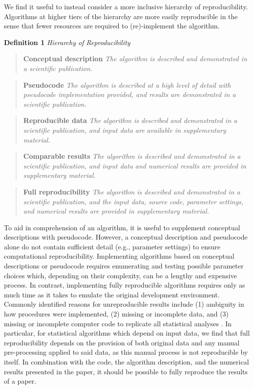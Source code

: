 \documentclass[11pt,]{isuthesis}
\begin{document}
We find it useful to instead consider a more inclusive hierarchy of reproducibility.
Algorithms at higher tiers of the hierarchy are more easily reproducible in the sense that fewer resources are required to (re)-implement the algorithm.

\textbf{Definition 1} \emph{Hierarchy of Reproducibility}

\begin{quote}
\textbf{Conceptual description} \emph{The algorithm is described and demonstrated in a scientific publication.}
\end{quote}

\begin{quote}
\textbf{Pseudocode} \emph{The algorithm is described at a high level of detail with pseudocode implementation provided, and results are demonstrated in a scientific publication.}
\end{quote}

\begin{quote}
\textbf{Reproducible data} \emph{The algorithm is described and demonstrated in a scientific publication, and input data are available in supplementary material.}
\end{quote}

\begin{quote}
\textbf{Comparable results} \emph{The algorithm is described and demonstrated in a scientific publication, and input data and numerical results are provided in supplementary material.}
\end{quote}

\begin{quote}
\textbf{Full reproducibility} \emph{The algorithm is described and demonstrated in a scientific publication, and the input data, source code, parameter settings, and numerical results are provided in supplementary material.}
\end{quote}

To aid in comprehension of an algorithm, it is useful to supplement conceptual descriptions with pseudocode.
However, a conceptual description and pseudocode alone do not contain sufficient detail (e.g., parameter settings) to ensure computational reproducibility.
Implementing algorithms based on conceptual descriptions or pseudocode requires enumerating and testing possible parameter choices which, depending on their complexity, can be a lengthy and expensive process.
In contrast, implementing fully reproducible algorithms requires only as much time as it takes to emulate the original development environment.
Commonly identified reasons for unreproducible results include (1) ambiguity in how procedures were implemented, (2) missing or incomplete data, and (3) missing or incomplete computer code to replicate all statistical analyses \citep{leek_is_2017}.
In particular, for statistical algorithms which depend on input data, we find that full reproducibility depends on the provision of both original data and any manual pre-processing applied to said data, as this manual process is not reproducible by itself.
In combination with the code, the algorithm description, and the numerical results presented in the paper, it should be possible to fully reproduce the results of a paper.
\end{document}
